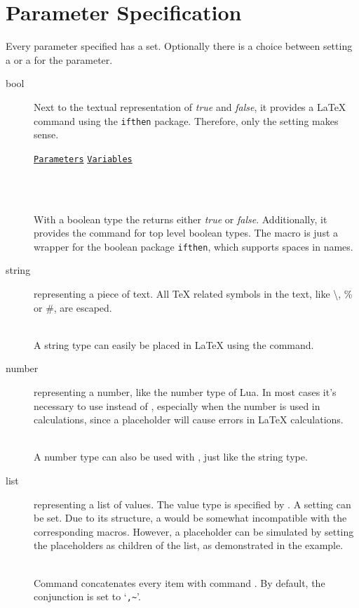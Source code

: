 \documentclass{ltxdoc}
\newcommand\showexample[5][15pt]{%
\begin{minipage}[t]{.5\linewidth - .5 \columnsep}%

\end{minipage}\hspace*{\columnsep}%
\begin{minipage}[t]{.5\linewidth - .5 \columnsep}%

\end{minipage}\\%
}
\begin{document}
    \section{Parameter Specification}
    Every parameter specified has a  set.
    Optionally there is a choice between setting a  or a  for the parameter.
    \begin{description}
        \item[bool] Next to the textual representation of \textit{true} and \textit{false}, it provides a \LaTeX{} command using the \texttt{ifthen} package.
        Therefore, only the  setting makes sense.\\[5pt]
        \hspace*{5pt}\parbox{\linewidth-5pt}{%
            \hfill\href{example/example-specification.yaml}{\texttt{Parameters}}\hfill\hspace*{\columnsep}%
            \hfill\href{example/example.yaml}{\texttt{Variables}}\hfill\hspace*{\columnsep}}\\%
        \showexample{1}{1-3}{1}{1-1}
        \DescribeMacro{\param}
        With a boolean type the \cmd{\param} returns either \textit{true} or \textit{false}.
        \DescribeMacro{\ifparam}
        Additionally, it provides the \cmd{\ifparam} command for top level boolean types.
        The macro is just a wrapper for the boolean package \texttt{ifthen}, which supports spaces in names.
        \item[string] representing a piece of text.
        All \TeX{} related symbols in the text, like \textbackslash, \% or \#, are escaped.\\
        \showexample{4}{4-6}{2}{2-2}
        \DescribeMacro{\param} A string type can easily be placed in \LaTeX{} using the \cmd{\param} command.
        \item[number] representing a number, like the number type of Lua.
        In most cases it's necessary to use  instead of , especially when the number is used in calculations, since a placeholder will cause errors in \LaTeX{} calculations.\\
        \showexample{7}{7-9}{3}{3-3}
        A number type can also be used with \cmd{\param}, just like the string type.
        \item[list] representing a list of values.
        The value type is specified by .
        A  setting can be set.
        Due to its structure, a  would be somewhat incompatible with the corresponding macros.
        However, a placeholder can be simulated by setting the placeholders as children of the  list, as demonstrated in the example.\\
        \showexample{10}{10-15}{4}{4-6}
        \DescribeMacro{\param}
        Command \cmd{\param} concatenates every item with command \cmd{\paramlist@conjunction}.
        \DescribeMacro{\paramlist@conjunction}
        By default, the conjunction is set to `\texttt{,\textasciitilde}'.


\end{description}
\end{document}
